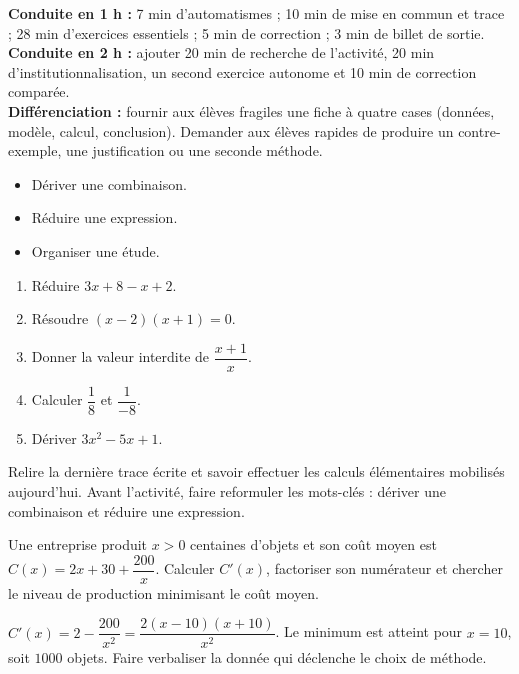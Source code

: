 \ifmxteacher
\begin{method}
\textbf{Conduite en 1 h :} 7 min d'automatismes ; 10 min de mise en commun et trace ; 28 min d'exercices essentiels ; 5 min de correction ; 3 min de billet de sortie.\\
\textbf{Conduite en 2 h :} ajouter 20 min de recherche de l'activité, 20 min d'institutionnalisation, un second exercice autonome et 10 min de correction comparée.\\
\textbf{Différenciation :} fournir aux élèves fragiles une fiche à quatre cases (données, modèle, calcul, conclusion). Demander aux élèves rapides de produire un contre-exemple, une justification ou une seconde méthode.
\end{method}
\fi
{}
\begin{objectives}\begin{itemize}\item Dériver une combinaison.\item Réduire une expression.\item Organiser une étude.\end{itemize}\end{objectives}
\begin{fluency}\begin{enumerate}\item Réduire $3x+8-x+2$. \item Résoudre $(x-2)(x+1)=0$. \item Donner la valeur interdite de $\dfrac{x+1}{x}$. \item Calculer $\dfrac1{8}$ et $\dfrac1{-8}$. \item Dériver $3x^2-5x+1$. \end{enumerate}\end{fluency}
\begin{prerequisites}Relire la dernière trace écrite et savoir effectuer les calculs élémentaires mobilisés aujourd'hui. Avant l'activité, faire reformuler les mots-clés : dériver une combinaison et réduire une expression.\end{prerequisites}

\begin{activity}
Une entreprise produit $x>0$ centaines d'objets et son coût moyen est $C(x)=2x+30+\dfrac{200}{x}$. Calculer $C'(x)$, factoriser son numérateur et chercher le niveau de production minimisant le coût moyen.

\end{activity}
\begin{solution}$C'(x)=2-\dfrac{200}{x^2}=\dfrac{2(x-10)(x+10)}{x^2}$. Le minimum est atteint pour $x=10$, soit $\num{1000}$ objets. Faire verbaliser la donnée qui déclenche le choix de méthode.\end{solution}

